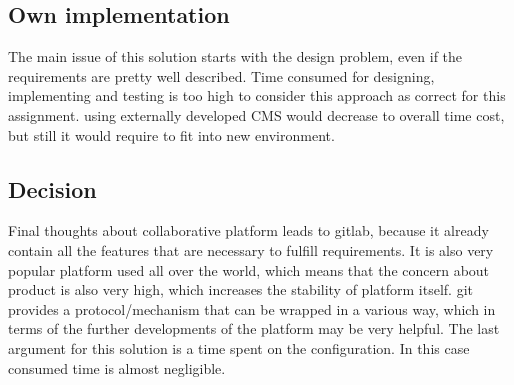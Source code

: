 	\subsection{Own implementation}
		The main issue of this solution starts with the design problem, even if the requirements are pretty well described. Time consumed for designing, implementing and testing is too high to consider this approach as correct for this assignment. using externally developed \gls{CMS} would decrease to overall time cost, but still it would require to fit into new environment.
	\subsection{Decision}
		Final thoughts about collaborative platform leads to \gls{gitlab}, because it already contain all the features that are necessary to fulfill requirements. It is also very popular platform used all over the world, which means that the concern about product is also very high, which increases the stability of platform itself. \gls{git} provides a protocol/mechanism that can be wrapped in a various way, which in terms of the further developments of the platform may be very helpful. The last argument for this solution is a time spent on the configuration. In this case consumed time is almost negligible.